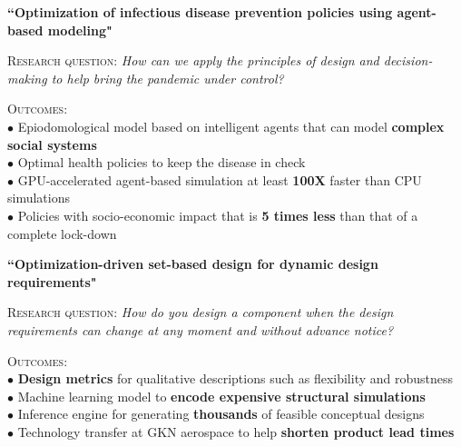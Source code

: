 \documentclass[10pt]{article} %
\begin{document}
{\raggedright\textbf{``Optimization of infectious disease prevention policies using agent-based modeling"}}

\textsc{Research question:} \textit{ How can we apply the principles of design and decision-making to help bring the pandemic under control?}

\textsc{Outcomes:}\vspace{-0.5em} ~~~~\\[1pt]

$\bullet$ Epiodomological model based on intelligent agents that can model \textbf{complex social systems}\\[1pt]
$\bullet$ Optimal health policies to keep the disease in check\\[1pt]
$\bullet$ GPU-accelerated agent-based simulation at least \textbf{100X} faster than CPU simulations\\[1pt]
$\bullet$ Policies with socio-economic impact that is \textbf{5 times less} than that of a complete lock-down

\medskip %

{\raggedright\textbf{``Optimization-driven set-based design for dynamic design requirements"}}

\textsc{Research question:} \textit{How do you design a component when the design requirements can change at any moment and without advance notice?}

\textsc{Outcomes:}\vspace{-0.5em} ~~~~~\\[1pt]

$\bullet$ \textbf{Design metrics} for qualitative descriptions such as flexibility and robustness\\[1pt]
$\bullet$ Machine learning model to \textbf{encode expensive structural simulations}\\[1pt]
$\bullet$ Inference engine for generating \textbf{thousands} of feasible conceptual designs\\[1pt]
$\bullet$ Technology transfer at GKN aerospace to help \textbf{shorten product lead times}
\end{document}
